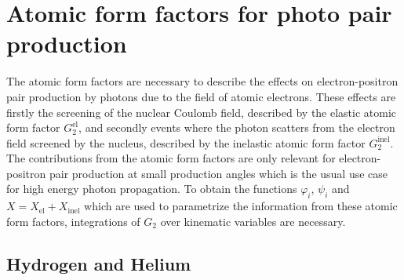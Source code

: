 \chapter{Atomic form factors for photo pair production}
\label{sec:atomic_form_factors}

The atomic form factors are necessary to describe the effects on electron-positron pair production by photons due to the field of atomic electrons.
These effects are firstly the screening of the nuclear Coulomb field, described by the elastic atomic form factor $G_2^{\text{el}}$, and secondly events where the photon scatters from the electron field screened by the nucleus, described by the inelastic atomic form factor $G_2^{\text{inel}}$.
The contributions from the atomic form factors are only relevant for electron-positron pair production at small production angles which is the usual use case for high energy photon propagation.
To obtain the functions $\varphi_i$, $\psi_i$ and $X = X_{\text{el}} + X_{\text{inel}}$ which are used to parametrize the information from these atomic form factors, integrations of $G_2$ over kinematic variables are necessary.

\section{Hydrogen and Helium}

